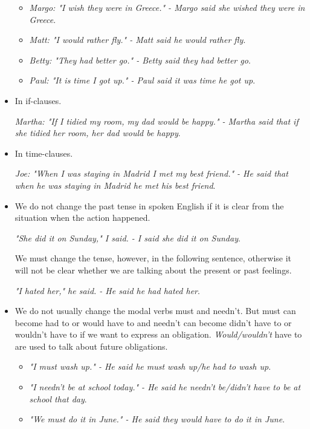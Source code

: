 \begin{itemize}
\begin{itemize}
\item \textit{Margo: "I wish they were in Greece." - Margo said she wished they were in Greece}.
\item \textit{Matt: "I would rather fly." - Matt said he would rather fly}.
\item \textit{Betty: "They had better go." - Betty said they had better go}.
\item \textit{Paul: "It is time I got up." - Paul said it was time he got up}.

\end{itemize}

\item In if-clauses.

\textit{Martha: "If I tidied my room, my dad would be happy." - Martha said that if she tidied her room, her dad would be happy}.

\item In time-clauses. 

\textit{Joe: "When I was staying in Madrid I met my best friend." - He said that when he was staying in Madrid he met his best friend}.

\item We do not change the past tense in spoken English if it is clear from the situation when the action happened.

\textit{"She did it on Sunday," I said. - I said she did it on Sunday}.

We must change the tense, however, in the following sentence, otherwise it will not be clear whether we are talking about the present or past feelings.

\textit{"I hated her," he said. - He said he had hated her}.

\item  We do not usually change the modal verbs must and needn't. But must can become had to or would have to and needn't can become didn't have to or wouldn't have to if we want to express an obligation. \textit{Would/wouldn't} have to are used to talk about future obligations.

\begin{itemize}

\item \textit{"I must wash up." - He said he must wash up/he had to wash up}.
\item \textit{"I needn't be at school today." - He said he needn't be/didn't have to be at school that day}.
\item \textit{"We must do it in June." - He said they would have to do it in June}.
\end{itemize}


\end{itemize}
